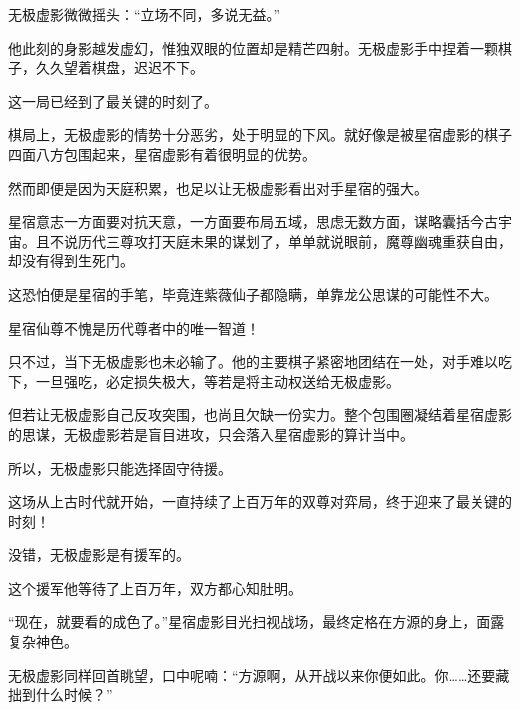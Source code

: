 \begin{this_body}
无极虚影微微摇头：“立场不同，多说无益。”

他此刻的身影越发虚幻，惟独双眼的位置却是精芒四射。无极虚影手中捏着一颗棋子，久久望着棋盘，迟迟不下。

这一局已经到了最关键的时刻了。

棋局上，无极虚影的情势十分恶劣，处于明显的下风。就好像是被星宿虚影的棋子四面八方包围起来，星宿虚影有着很明显的优势。

然而即便是因为天庭积累，也足以让无极虚影看出对手星宿的强大。

星宿意志一方面要对抗天意，一方面要布局五域，思虑无数方面，谋略囊括今古宇宙。且不说历代三尊攻打天庭未果的谋划了，单单就说眼前，魔尊幽魂重获自由，却没有得到生死门。

这恐怕便是星宿的手笔，毕竟连紫薇仙子都隐瞒，单靠龙公思谋的可能性不大。

星宿仙尊不愧是历代尊者中的唯一智道！

只不过，当下无极虚影也未必输了。他的主要棋子紧密地团结在一处，对手难以吃下，一旦强吃，必定损失极大，等若是将主动权送给无极虚影。

但若让无极虚影自己反攻突围，也尚且欠缺一份实力。整个包围圈凝结着星宿虚影的思谋，无极虚影若是盲目进攻，只会落入星宿虚影的算计当中。

所以，无极虚影只能选择固守待援。

这场从上古时代就开始，一直持续了上百万年的双尊对弈局，终于迎来了最关键的时刻！

没错，无极虚影是有援军的。

这个援军他等待了上百万年，双方都心知肚明。

“现在，就要看的成色了。”星宿虚影目光扫视战场，最终定格在方源的身上，面露复杂神色。

无极虚影同样回首眺望，口中呢喃：“方源啊，从开战以来你便如此。你……还要藏拙到什么时候？”

\end{this_body}

